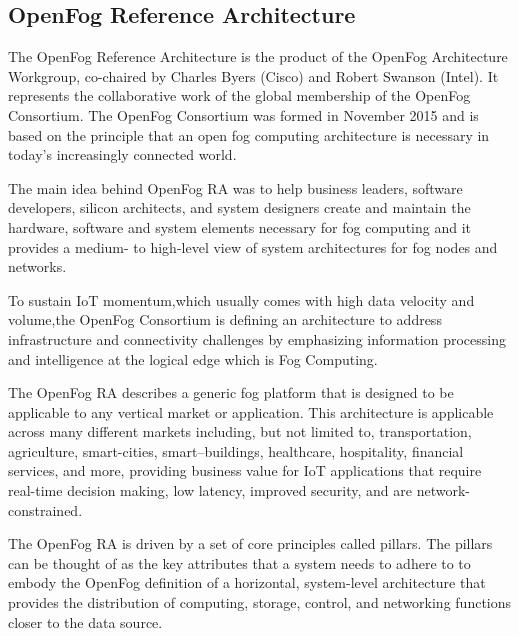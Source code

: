 \documentclass{article}
\begin{document}
\subsection{OpenFog Reference Architecture}

The OpenFog Reference Architecture is the product of the OpenFog Architecture Workgroup, co-chaired by Charles Byers (Cisco) and Robert Swanson (Intel)\cite{openfogconsortium2017}. 
It represents the collaborative work of the global membership of the OpenFog Consortium\cite{openfogconsortium2017}. 
The OpenFog Consortium was formed in November 2015 and is based on the principle that an open fog computing architecture is necessary in today’s increasingly connected world\cite{openfogconsortium2017}.

The main idea behind OpenFog RA was to help business leaders, software developers, silicon architects, and system designers create and maintain the hardware, software and system elements necessary for fog computing and it provides a medium- to high-level view of system architectures for fog nodes and networks.

To sustain IoT momentum,which usually comes with high data velocity and volume,the OpenFog Consortium is defining an architecture to address infrastructure and connectivity challenges by emphasizing information processing and intelligence at the logical edge which is Fog Computing.

The OpenFog RA describes a generic fog platform that is designed to be applicable to any vertical market or application. This architecture is applicable across many different markets including, but not limited to, transportation, agriculture, smart-cities, smart–buildings, healthcare, hospitality, financial services, and more, providing business value for IoT applications that require real-time decision making, low latency, improved security, and are network-constrained\cite{openfogconsortium2017}.

The OpenFog RA is driven by a set of core principles called pillars\cite{openfogconsortium2017}.
The pillars can be thought of as the key attributes that a system needs to adhere to to embody the OpenFog definition of a horizontal, system-level architecture that provides the distribution of computing, storage, control, and networking functions closer to the data source\cite{openfogconsortium2017}.
\end{document}
